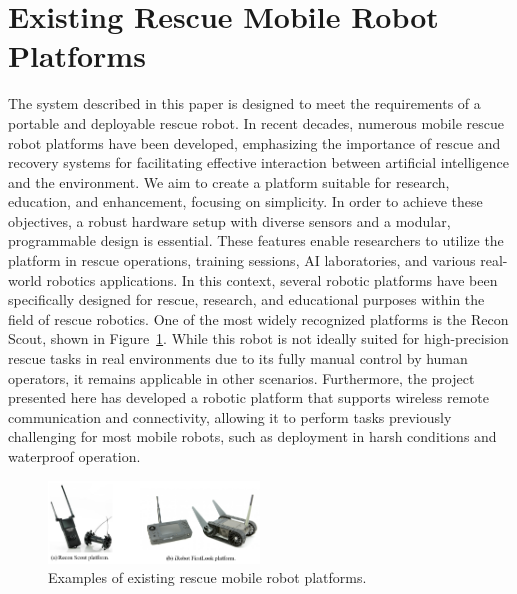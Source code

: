 \documentclass[conference]{IEEEtran}
\begin{document}
\section{Existing Rescue Mobile Robot Platforms} 
The system described in this paper is designed to meet the requirements of a portable and deployable rescue robot. In recent decades, numerous mobile rescue robot platforms have been developed, emphasizing the importance of rescue and recovery systems for facilitating effective interaction between artificial intelligence and the environment. We aim to create a platform suitable for research, education, and enhancement, focusing on simplicity. In order to achieve these objectives, a robust hardware setup with diverse sensors and a modular, programmable design is essential. These features enable researchers to utilize the platform in rescue operations, training sessions, AI laboratories, and various real-world robotics applications. In this context, several robotic platforms have been specifically designed for rescue, research, and educational purposes within the field of rescue robotics. One of the most widely recognized platforms is the Recon Scout, shown in Figure~\ref{Fig_iRobotAndRecon}. While this robot is not ideally suited for high-precision rescue tasks in real environments due to its fully manual control by human operators, it remains applicable in other scenarios. Furthermore, the project presented here has developed a robotic platform that supports wireless remote communication and connectivity, allowing it to perform tasks previously challenging for most mobile robots, such as deployment in harsh conditions and waterproof operation.

\begin{figure}[htbp] 
    \centerline{\includegraphics[width=0.5\textwidth]{Fig_iRobotAndRecon.PNG}} 
    \caption{Examples of existing rescue mobile robot platforms.} 
    \label{Fig_iRobotAndRecon} 
\end{figure}
\end{document}
